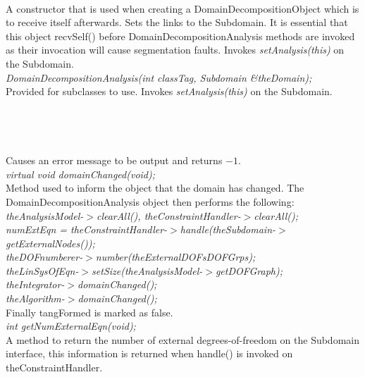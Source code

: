  \\
A constructor that is used when creating a DomainDecompositionObject which
is to receive itself afterwards. Sets the links to the Subdomain. It is
essential that this object recvSelf() before DomainDecompositionAnalysis
methods are invoked as their invocation will cause segmentation faults. 
Invokes {\em setAnalysis(this)} on the Subdomain. \\

{\em DomainDecompositionAnalysis(int classTag, Subdomain \&theDomain);}\\
Provided for subclasses to use. Invokes {\em setAnalysis(this)} on the
Subdomain. \\ 


 \\
\\ 

\\
 \\
Causes an error message to be output and returns $-1$. \\

{\em virtual void domainChanged(void);} \\
Method used to inform the object that the domain has changed. The
DomainDecompositionAnalysis object then performs the following: \\ {\em
\indent\indent theAnalysisModel-$>$clearAll(),
theConstraintHandler-$>$clearAll();\\ 
\indent\indent numExtEqn =
theConstraintHandler-$>$handle(theSubdomain-$>$getExternalNodes());\\ 
\indent\indent theDOFnumberer-$>$number(theExternalDOFsDOFGrps);  \\
\indent\indent theLinSysOfEqn-$>$setSize(theAnalysisModel-$>$getDOFGraph);  \\
\indent\indent theIntegrator-$>$domainChanged(); \\
\indent\indent theAlgorithm-$>$domainChanged(); \\ }
Finally \p tangFormed is marked as \p false. \\

{\em int getNumExternalEqn(void);} \\
A method to return the number of external degrees-of-freedom on the
Subdomain interface, this information is returned when handle()
is invoked on \p theConstraintHandler. \\

